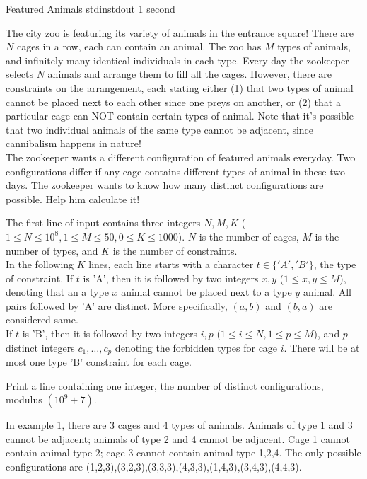 \begin{problem}{Featured Animals}
{stdin}{stdout}
{1 second}{}{}

The city zoo is featuring its variety of animals in the entrance square! There are $N$ cages in a row, each can contain an animal. The zoo has $M$ types of animals, and infinitely many identical individuals in each type. Every day the zookeeper selects $N$ animals and arrange them to fill all the cages. However, there are constraints on the arrangement, each stating either (1) that two types of animal cannot be placed next to each other since one preys on another, or (2) that a particular cage can NOT contain certain types of animal. Note that it's possible that two individual animals of the same type cannot be adjacent, since cannibalism happens in nature! \\

The zookeeper wants a different configuration of featured animals everyday. Two configurations differ if any cage contains different types of animal in these two days. The zookeeper wants to know how many distinct configurations are possible. Help him calculate it! 

\InputFile

The first line of input contains three integers $N, M, K$ ($1 \le N \le 10^8, 1 \le M \le 50, 0 \le K \le 1000$). $N$ is the number of cages, $M$ is the number of types, and $K$ is the number of constraints. \\
In the following $K$ lines, each line starts with a character $t \in \{'A','B'\}$, the type of constraint. If $t$ is 'A', then it is followed by two integers $x, y$ ($1 \le x, y \le M$), denoting that an a type $x$ animal cannot be placed next to a type $y$ animal. All pairs followed by 'A' are distinct. More specifically, $(a, b)$ and $(b, a)$ are considered same.
\\ If $t$ is 'B', then it is followed by two integers $i, p$ ($1 \le i \le N, 1 \le p \le M$), and $p$ distinct integers $c_1, \hdots, c_p$ denoting the forbidden types for cage $i$. There will be at most one type 'B' constraint for each cage.

\OutputFile

Print a line containing one integer, the number of distinct configurations, modulus $(10^9+7)$. 

\Examples

\begin{example}
%
%
\end{example}

\Notes

In example 1, there are 3 cages and 4 types of animals. Animals of type 1 and 3 cannot be adjacent; animals of type 2 and 4 cannot be adjacent. Cage 1 cannot contain animal type 2; cage 3 cannot contain animal type 1,2,4. The only possible configurations are (1,2,3),(3,2,3),(3,3,3),(4,3,3),(1,4,3),(3,4,3),(4,4,3). 

\end{problem}
